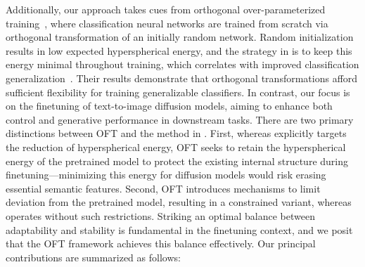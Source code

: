Additionally, our approach takes cues from orthogonal over-parameterized training~\cite{liu2021orthogonal}, where classification neural networks are trained from scratch via orthogonal transformation of an initially random network. Random initialization results in low expected hyperspherical energy, and the strategy in \cite{liu2021orthogonal} is to keep this energy minimal throughout training, which correlates with improved classification generalization~\cite{liu2018learning,lin2020regularizing}. Their results demonstrate that orthogonal transformations afford sufficient flexibility for training generalizable classifiers. In contrast, our focus is on the finetuning of text-to-image diffusion models, aiming to enhance both control and generative performance in downstream tasks. There are two primary distinctions between OFT and the method in \cite{liu2021orthogonal}. First, whereas \cite{liu2021orthogonal} explicitly targets the reduction of hyperspherical energy, OFT seeks to retain the hyperspherical energy of the pretrained model to protect the existing internal structure during finetuning—minimizing this energy for diffusion models would risk erasing essential semantic features. Second, OFT introduces mechanisms to limit deviation from the pretrained model, resulting in a constrained variant, whereas \cite{liu2021orthogonal} operates without such restrictions. Striking an optimal balance between adaptability and stability is fundamental in the finetuning context, and we posit that the OFT framework achieves this balance effectively. Our principal contributions are summarized as follows:


